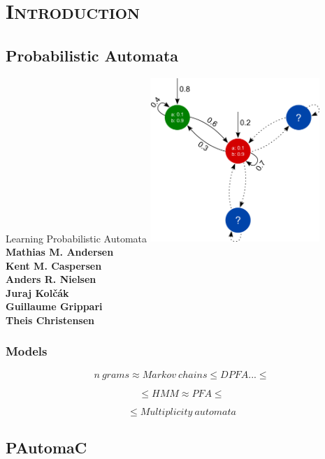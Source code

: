 \section{\scshape Introduction}
\subsection{Probabilistic Automata}

\begin{frame}
	\begin{center}
		\Large{Learning Probabilistic Automata}
		\includegraphics[width=0.48\textwidth]{images/frontpagemodel.pdf}\\
		\small{\textbf{Mathias M. Andersen\\
		Kent M. Caspersen\\
		Anders R. Nielsen\\
		Juraj Kol\v{c}\'{a}k\\
		Guillaume Grippari\\
		Theis Christensen\\}}
	\end{center}
\end{frame}

\begin{frame}
	\begin{center}
		\frametitle{Models}
		
		$$n~grams \approx Markov~chains \leq DPFA...\leq$$
		
		$$\leq HMM \approx PFA\leq$$
		
		$$\leq Multiplicity~automata$$
	\end{center}
\end{frame}

\subsection{PAutomaC}

